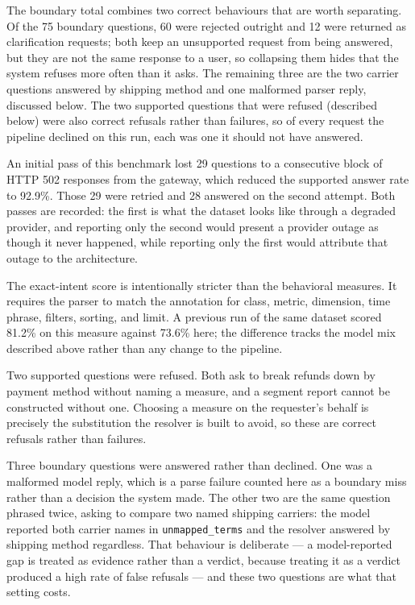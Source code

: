 \documentclass[pdflatex,sn-mathphys-num]{sn-jnl}
\begin{document}
The boundary total combines two correct behaviours that are worth separating. Of the 75 boundary questions, 60 were rejected outright and 12 were returned as clarification requests; both keep an unsupported request from being answered, but they are not the same response to a user, so collapsing them hides that the system refuses more often than it asks. The remaining three are the two carrier questions answered by shipping method and one malformed parser reply, discussed below. The two supported questions that were refused (described below) were also correct refusals rather than failures, so of every request the pipeline declined on this run, each was one it should not have answered.


An initial pass of this benchmark lost 29 questions to a consecutive block of HTTP 502 responses from the gateway, which reduced the supported answer rate to 92.9\%. Those 29 were retried and 28 answered on the second attempt. Both passes are recorded: the first is what the dataset looks like through a degraded provider, and reporting only the second would present a provider outage as though it never happened, while reporting only the first would attribute that outage to the architecture.


The exact-intent score is intentionally stricter than the behavioral measures. It requires the parser to match the annotation for class, metric, dimension, time phrase, filters, sorting, and limit. A previous run of the same dataset scored 81.2\% on this measure against 73.6\% here; the difference tracks the model mix described above rather than any change to the pipeline.


Two supported questions were refused. Both ask to break refunds down by payment method without naming a measure, and a segment report cannot be constructed without one. Choosing a measure on the requester's behalf is precisely the substitution the resolver is built to avoid, so these are correct refusals rather than failures.


Three boundary questions were answered rather than declined. One was a malformed model reply, which is a parse failure counted here as a boundary miss rather than a decision the system made. The other two are the same question phrased twice, asking to compare two named shipping carriers: the model reported both carrier names in \texttt{unmapped\_terms} and the resolver answered by shipping method regardless. That behaviour is deliberate — a model-reported gap is treated as evidence rather than a verdict, because treating it as a verdict produced a high rate of false refusals — and these two questions are what that setting costs.
\end{document}
